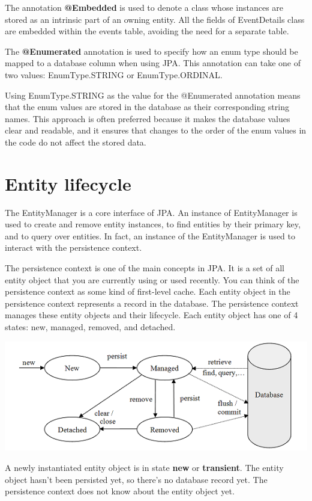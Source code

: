 The annotation \textbf{@Embedded}  is used to denote a class whose instances are stored as an intrinsic part of an owning entity.
 All the fields of EventDetails class are embedded within the events table, avoiding the need for a separate table.

The \textbf{@Enumerated} annotation is used to specify how an enum type should be mapped to a database column when using JPA. This annotation can take one of two values: EnumType.STRING or EnumType.ORDINAL.

Using EnumType.STRING as the value for the @Enumerated annotation means that the enum values are stored in the database as their corresponding string names. This approach is often preferred because it makes the database values clear and readable, and it ensures that changes to the order of the enum values in the code do not affect the stored data.

\section{Entity lifecycle}

The EntityManager is a core interface of JPA.  An instance of EntityManager is used to create and remove  entity instances, to find entities by their primary key,  and to query over entities.  In fact,  an instance of the EntityManager is used to interact with the persistence context. 

The persistence context is one of the main concepts in JPA.
It is a set of all entity object that you are currently using or used recently. You can think of the persistence context as some kind of first-level cache. Each entity object in the persistence context represents a record in the database.
The persistence context manages these entity objects and their lifecycle. Each entity object has one of 4 states: new, managed, removed, and detached.

\includegraphics[width=\textwidth]{./images/chapter6/entity_states}

A newly instantiated entity object is in state \textbf{new} or \textbf{transient}. The entity object hasn't been persisted yet, so there's no database record yet. The persistence context does not know about the entity object yet. 

